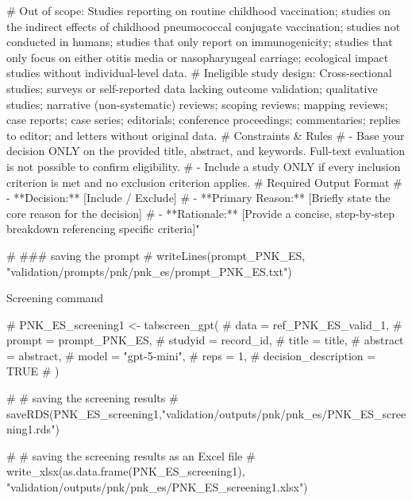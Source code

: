 \documentclass[
  letterpaper,
  DIV=11,
  numbers=noendperiod]{scrartcl}
\newenvironment{Shaded}{\begin{snugshade}}{\end{snugshade}}
\newcommand{\AlertTok}[1]{\textcolor[rgb]{0.68,0.00,0.00}{#1}}
\newcommand{\CommentTok}[1]{\textcolor[rgb]{0.37,0.37,0.37}{#1}}
\begin{document}
\begin{Shaded}
\begin{Highlighting}[]
\CommentTok{\# Out of scope: Studies reporting on routine childhood vaccination; studies on the indirect effects of childhood pneumococcal conjugate vaccination; studies not conducted in humans; studies that only report on immunogenicity; studies that only focus on either otitis media or nasopharyngeal carriage; ecological impact studies without individual{-}level data.}
\CommentTok{\# Ineligible study design: Cross{-}sectional studies; surveys or self{-}reported data lacking outcome validation; qualitative studies; narrative (non{-}systematic) reviews; scoping reviews; mapping reviews; case reports; case series; editorials; conference proceedings; commentaries; replies to editor; and letters without original data.}
\CommentTok{\# Constraints \& Rules}
\CommentTok{\# {-} Base your decision ONLY on the provided title, abstract, and keywords. Full{-}text evaluation is not possible to confirm eligibility.}
\CommentTok{\# {-} Include a study ONLY if every inclusion criterion is met and no exclusion criterion applies.}
\CommentTok{\# Required Output Format}
\CommentTok{\# {-} **Decision:** [Include / Exclude]}
\CommentTok{\# {-} **Primary Reason:** [Briefly state the core reason for the decision]}
\CommentTok{\# {-} **Rationale:** [Provide a concise, step{-}by{-}step breakdown referencing specific criteria]"}

\CommentTok{\# }\AlertTok{\#\#\#}\CommentTok{ saving the prompt}
\CommentTok{\# writeLines(prompt\_PNK\_ES, "validation/prompts/pnk/pnk\_es/prompt\_PNK\_ES.txt")}
\end{Highlighting}
\end{Shaded}

Screening command

\begin{Shaded}
\begin{Highlighting}[]
\CommentTok{\# PNK\_ES\_screening1 \textless{}{-} tabscreen\_gpt(}
\CommentTok{\#   data = ref\_PNK\_ES\_valid\_1,}
\CommentTok{\#   prompt = prompt\_PNK\_ES,}
\CommentTok{\#   studyid = record\_id,}
\CommentTok{\#   title = title,}
\CommentTok{\#   abstract = abstract,}
\CommentTok{\#   model = "gpt{-}5{-}mini",}
\CommentTok{\#   reps = 1,}
\CommentTok{\#   decision\_description = TRUE}
\CommentTok{\# )}

\CommentTok{\# \# saving the screening results}
\CommentTok{\# saveRDS(PNK\_ES\_screening1,"validation/outputs/pnk/pnk\_es/PNK\_ES\_screening1.rds")}

\CommentTok{\# \# saving the screening results as an Excel file}
\CommentTok{\# write\_xlsx(as.data.frame(PNK\_ES\_screening1), "validation/outputs/pnk/pnk\_es/PNK\_ES\_screening1.xlsx")}
\end{Highlighting}
\end{Shaded}
\end{document}
